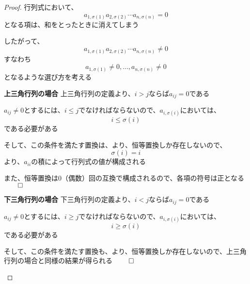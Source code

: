 \documentclass[../../../topic_linear-algebra]{subfiles}
\begin{document}
\begin{proof}
  行列式において、
  \begin{equation*}
    a_{1,\sigma(1)} a_{2,\sigma(2)} \cdots a_{n,\sigma(n)} = 0
  \end{equation*}
  となる項は、和をとったときに消えてしまう

  したがって、
  \begin{equation*}
    a_{1,\sigma(1)} a_{2,\sigma(2)} \cdots a_{n,\sigma(n)} \neq 0
  \end{equation*}
  すなわち
  \begin{equation*}
    a_{1,\sigma(1)} \neq 0, \ldots, a_{n,\sigma(n)} \neq 0
  \end{equation*}
  となるような選び方を考える

  \begin{subpattern}{\bfseries 上三角行列の場合}
    上三角行列の定義より、$i > j$ならば$a_{ij} = 0$である

    $a_{ij} \neq 0$とするには、$i \leq j$でなければならないので、$a_{i,\sigma(i)}$においては、
    \begin{equation*}
      i \leq \sigma(i)
    \end{equation*}
    である必要がある

    そして、この条件を満たす置換は、より、恒等置換しか存在しないので、
    \begin{equation*}
      \sigma(i) = i
    \end{equation*}
    より、$a_{ii}$の積によって行列式の値が構成される

    また、恒等置換は0（偶数）回の互換で構成されるので、各項の符号は正となる $\qed$
  \end{subpattern}

  \begin{subpattern}{\bfseries 下三角行列の場合}
    下三角行列の定義より、$i < j$ならば$a_{ij} = 0$である

    $a_{ij} \neq 0$とするには、$i \geq j$でなければならないので、$a_{i,\sigma(i)}$においては、
    \begin{equation*}
      i \geq \sigma(i)
    \end{equation*}
    である必要がある

    そして、この条件を満たす置換も、より、恒等置換しか存在しないので、上三角行列の場合と同様の結果が得られる $\qed$
  \end{subpattern}
\end{proof}
\end{document}
